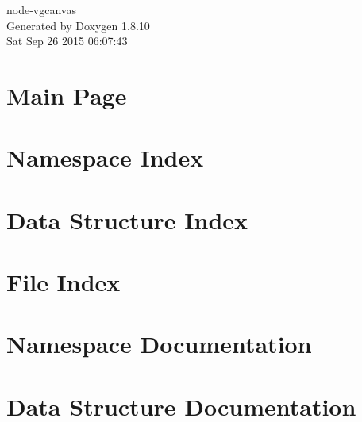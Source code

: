 \documentclass[twoside]{book}
\newcommand{\+}{\discretionary{\mbox{\scriptsize$\hookleftarrow$}}{}{}}
\newcommand{\clearemptydoublepage}{%
  \newpage{\pagestyle{empty}\cleardoublepage}%
}
\begin{document}
\hypersetup{pageanchor=false,
             bookmarks=true,
             bookmarksnumbered=true,
             pdfencoding=unicode
            }
\begin{titlepage}
\vspace*{7cm}
\begin{center}%
{\Large node-\/vgcanvas }\\
\vspace*{1cm}
{\large Generated by Doxygen 1.8.10}\\
\vspace*{0.5cm}
{\small Sat Sep 26 2015 06:07:43}\\
\end{center}
\end{titlepage}
\clearemptydoublepage
\tableofcontents
\clearemptydoublepage
{}
\hypersetup{pageanchor=true}

\chapter{Main Page}
\label{index}\hypertarget{index}{}
\chapter{Namespace Index}

\chapter{Data Structure Index}

\chapter{File Index}

\chapter{Namespace Documentation}

\chapter{Data Structure Documentation}




\end{document}
